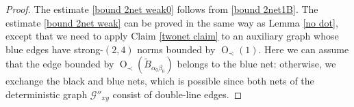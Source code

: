 \documentclass{article}
\newcommand{\1}{\mathds{1}}
\numberwithin{equation}{section}
\newcommand{\al}{\alpha}
\newcommand{\be}{\begin{equation}}
\newcommand{\ee}{\end{equation}}
\renewcommand{\cal}{\mathcal}
\newcommand{\wt}{\widetilde}
\renewcommand{\geq}{\geqslant}
\renewcommand{\ge}{\geq}
\DeclareMathOperator{\OO}{O}
\theoremstyle{plain} %
\theoremstyle{remark}
\begin{document}
\begin{proof}
The estimate \eqref{bound 2net weak0} follows from \eqref{bound 2net1B}. The estimate \eqref{bound 2net weak} can be proved in the same way as Lemma \ref{no dot}, except that we need to apply Claim \ref{twonet claim} to an auxiliary graph whose blue edges have strong-$(2,4)$ norms bounded by $\OO_\prec(1)$. Here we can assume that the edge bounded by $\OO_\prec (\wt B_{\al_0 \beta_0})$ belongs to the blue net: otherwise, we exchange the black and blue nets, which is possible since both nets of the deterministic graph $\cal G''_{xy}$ consist of double-line edges.
\end{proof}
\end{document}
